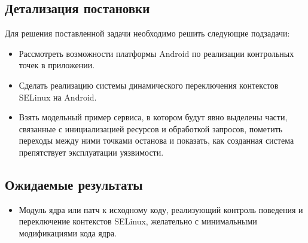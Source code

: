 \subsection{Детализация постановки}
Для решения поставленной задачи необходимо решить следующие подзадачи:
\begin{itemize}
\item Рассмотреть возможности платформы Android по реализации
    контрольных точек в приложении.
\item Сделать реализацию системы динамического переключения контекстов
    SELinux на Android.
\item Взять модельный пример сервиса, в котором будут явно выделены
    части, связанные с инициализацией ресурсов и обработкой запросов,
    пометить переходы между ними точками останова и показать, как
    созданная система препятствует эксплуатации уязвимости.
\end{itemize}

\subsection{Ожидаемые результаты}
\begin{itemize}
\item Модуль ядра или патч к исходному коду, реализующий контроль
    поведения и переключение контекстов SELinux, желательно с
    минимальными модификациями кода ядра.
\end{itemize}
